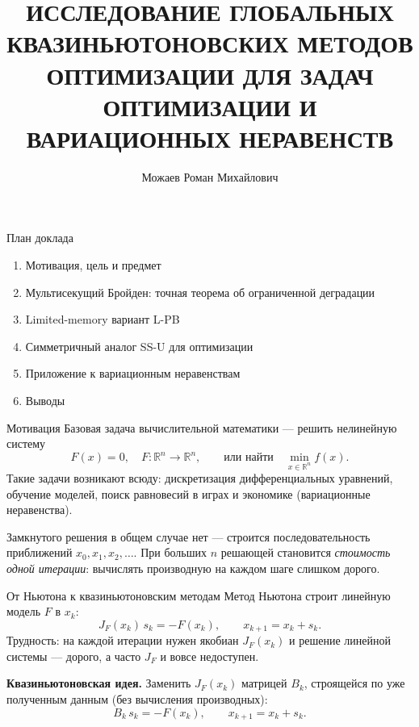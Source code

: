 \documentclass[aspectratio=169,11pt,t]{beamer}
\title{ИССЛЕДОВАНИЕ ГЛОБАЛЬНЫХ КВАЗИНЬЮТОНОВСКИХ
МЕТОДОВ ОПТИМИЗАЦИИ ДЛЯ ЗАДАЧ ОПТИМИЗАЦИИ И
ВАРИАЦИОННЫХ НЕРАВЕНСТВ}
\author{Можаев Роман Михайлович}
\newcommand{\R}{\mathbb{R}}
\begin{document}
\begin{frame}
  \titlepage
\end{frame}

\begin{frame}{План доклада}
  \begin{enumerate}
    \item Мотивация, цель и предмет
    \item Мультисекущий Бройден: точная теорема об ограниченной деградации
    \item Limited-memory вариант L-PB
    \item Симметричный аналог SS-U для оптимизации
    \item Приложение к вариационным неравенствам
    \item Выводы
  \end{enumerate}
\end{frame}

\begin{frame}{Мотивация}
Базовая задача вычислительной математики — решить нелинейную систему
\[ F(x)=0,\quad F\colon\R^n\to\R^n,\qquad\text{или найти}\quad \min_{x\in\R^n} f(x). \]
Такие задачи возникают всюду: дискретизация дифференциальных уравнений, обучение
моделей, поиск равновесий в играх и экономике (вариационные неравенства).

\medskip
Замкнутого решения в общем случае нет — строится последовательность приближений
\(x_0,x_1,x_2,\ldots\). При больших \(n\) решающей становится \emph{стоимость одной
итерации}: вычислять производную на каждом шаге слишком дорого.
\end{frame}

\begin{frame}{От Ньютона к квазиньютоновским методам}
Метод Ньютона строит линейную модель \(F\) в \(x_k\):
\[ J_F(x_k)\,s_k=-F(x_k),\qquad x_{k+1}=x_k+s_k. \]
Трудность: на каждой итерации нужен якобиан \(J_F(x_k)\) и решение линейной системы —
дорого, а часто \(J_F\) и вовсе недоступен.

\medskip
\textbf{Квазиньютоновская идея.} Заменить \(J_F(x_k)\) матрицей \(B_k\), строящейся
по уже полученным данным (без вычисления производных):
\[ B_k\,s_k=-F(x_k),\qquad x_{k+1}=x_k+s_k. \]
\end{frame}
\end{document}

